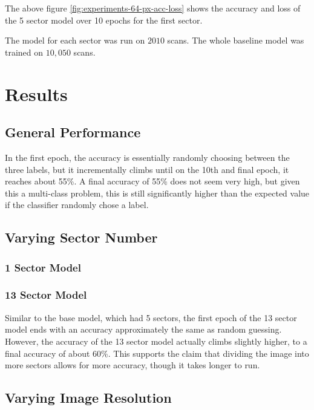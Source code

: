 \documentclass[10pt,twocolumn,letterpaper]{article}
\begin{document}
      The above figure \ref{fig:experiments-64-px-acc-loss} shows the accuracy and loss of the 5 sector model over 10 epochs for the first sector.
    
      The model for each sector was run on $2010$ scans. The whole baseline model was trained on $10,050$ scans.
\section{Results} \label{sec:results}

   \subsection{General Performance} \label{sec:results-general-performance}

      In the first epoch, the accuracy is essentially randomly choosing between the three labels, but it incrementally climbs until on the 10th and final epoch, it reaches about 55\%. A final accuracy of 55\% does not seem very high, but given this a multi-class problem, this is still significantly higher than the expected value if the classifier randomly chose a label.

   \subsection{Varying Sector Number} \label{sec:results-sector}

      \subsubsection{1 Sector Model} \label{sec:results-sector-1}

      \subsubsection{13 Sector Model} \label{sec:results-sector-13}
         Similar to the base model, which had 5 sectors, the first epoch of the 13 sector model ends with an accuracy approximately the same as random guessing. However, the accuracy of the 13 sector model actually climbs slightly higher, to a final accuracy of about 60\%. This supports the claim that dividing the image into more sectors allows for more accuracy, though it takes longer to run. 

   \subsection{Varying Image Resolution} \label{sec:results-res}
\end{document}
